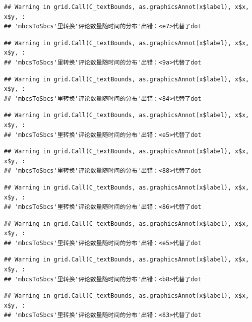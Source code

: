 \documentclass[
]{article}
\begin{document}
\begin{verbatim}
## Warning in grid.Call(C_textBounds, as.graphicsAnnot(x$label), x$x, x$y, :
## 'mbcsToSbcs'里转换'评论数量随时间的分布'出错：<e7>代替了dot
\end{verbatim}

\begin{verbatim}
## Warning in grid.Call(C_textBounds, as.graphicsAnnot(x$label), x$x, x$y, :
## 'mbcsToSbcs'里转换'评论数量随时间的分布'出错：<9a>代替了dot
\end{verbatim}

\begin{verbatim}
## Warning in grid.Call(C_textBounds, as.graphicsAnnot(x$label), x$x, x$y, :
## 'mbcsToSbcs'里转换'评论数量随时间的分布'出错：<84>代替了dot
\end{verbatim}

\begin{verbatim}
## Warning in grid.Call(C_textBounds, as.graphicsAnnot(x$label), x$x, x$y, :
## 'mbcsToSbcs'里转换'评论数量随时间的分布'出错：<e5>代替了dot
\end{verbatim}

\begin{verbatim}
## Warning in grid.Call(C_textBounds, as.graphicsAnnot(x$label), x$x, x$y, :
## 'mbcsToSbcs'里转换'评论数量随时间的分布'出错：<88>代替了dot
\end{verbatim}

\begin{verbatim}
## Warning in grid.Call(C_textBounds, as.graphicsAnnot(x$label), x$x, x$y, :
## 'mbcsToSbcs'里转换'评论数量随时间的分布'出错：<86>代替了dot
\end{verbatim}

\begin{verbatim}
## Warning in grid.Call(C_textBounds, as.graphicsAnnot(x$label), x$x, x$y, :
## 'mbcsToSbcs'里转换'评论数量随时间的分布'出错：<e5>代替了dot
\end{verbatim}

\begin{verbatim}
## Warning in grid.Call(C_textBounds, as.graphicsAnnot(x$label), x$x, x$y, :
## 'mbcsToSbcs'里转换'评论数量随时间的分布'出错：<b8>代替了dot
\end{verbatim}

\begin{verbatim}
## Warning in grid.Call(C_textBounds, as.graphicsAnnot(x$label), x$x, x$y, :
## 'mbcsToSbcs'里转换'评论数量随时间的分布'出错：<83>代替了dot
\end{verbatim}
\end{document}
